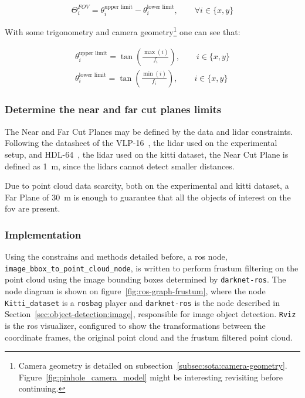 \begin{equation}
	\label{eq:image-fov}
	\Theta^{FOV}_i = \theta^\text{upper limit}_i - \theta^\text{lower limit}_i, \qquad \forall i \in \{x, y\}
\end{equation}

With some trigonometry and camera geometry\footnote{Camera geometry is detailed on subsection~\ref{subsec:sota:camera-geometry}. Figure~\ref{fig:pinhole_camera_model} might be interesting revisiting before continuing.} one can see that:

\begin{align}
	\theta^\text{upper limit}_i = \tan\left(\frac{\max(i)}{f_i}\right), \qquad i \in \{x, y\} \\
	\theta^\text{lower limit}_i = \tan\left(\frac{\min(i)}{f_i}\right), \qquad i \in \{x, y\} 
\end{align}

\subsubsection{Determine the near and far cut planes limits}
The Near and Far Cut Planes may be defined by the data and \ac{lidar} constraints. Following the datasheet of the VLP-16~\cite{vlp16}, the \ac{lidar} used on the experimental setup, and HDL-64~\cite{VelodyneHDL64}, the \ac{lidar} used on the \ac{kitti} dataset, the Near Cut Plane is defined as \SI{1}{\meter}, since the \acp{lidar} cannot detect smaller distances.

Due to point cloud data scarcity, both on the experimental and  \ac{kitti} dataset, a Far Plane of \SI{30}{\meter} is enough to guarantee that all the objects of interest on the \ac{fov} are present.

\subsubsection{Implementation}
Using the constrains and methods detailed before, a \ac{ros} node, \texttt{image\_bbox\_to\_point\_cloud\_node}, is written to perform frustum filtering on the point cloud using the image bounding boxes determined by \texttt{darknet-ros}. The node diagram is shown on figure~\ref{fig:ros-graph-frustum}, where the node \texttt{Kitti\_dataset} is a \texttt{rosbag} player and \texttt{darknet-ros} is the node described in Section~\ref{sec:object-detection:image}, responsible for image object detection. \texttt{Rviz} is the \ac{ros} visualizer, configured to show the transformations between the coordinate frames, the original point cloud and the frustum filtered point cloud.

